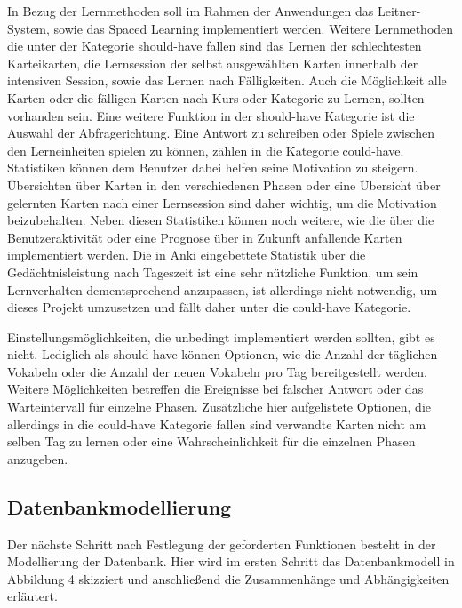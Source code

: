 In Bezug der Lernmethoden soll im Rahmen der Anwendungen das Leitner-System, sowie das Spaced Learning implementiert werden. Weitere Lernmethoden die unter der Kategorie should-have fallen sind das Lernen der schlechtesten Karteikarten, die Lernsession der selbst ausgewählten Karten innerhalb der intensiven Session, sowie das Lernen nach Fälligkeiten. Auch die Möglichkeit alle Karten oder die fälligen Karten nach Kurs oder Kategorie zu Lernen, sollten vorhanden sein. Eine weitere Funktion in der should-have Kategorie ist die Auswahl der Abfragerichtung. Eine Antwort zu schreiben oder Spiele zwischen den Lerneinheiten spielen zu können, zählen in die Kategorie could-have. \\

Statistiken können dem Benutzer dabei helfen seine Motivation zu steigern. Übersichten über Karten in den verschiedenen Phasen oder eine Übersicht über gelernten Karten nach einer Lernsession sind daher wichtig, um die Motivation beizubehalten. Neben diesen Statistiken können noch weitere, wie die über die Benutzeraktivität oder eine Prognose über in Zukunft anfallende Karten implementiert werden. Die in Anki eingebettete Statistik über die Gedächtnisleistung nach Tageszeit ist eine sehr nützliche Funktion, um sein Lernverhalten dementsprechend anzupassen, ist allerdings nicht notwendig, um dieses Projekt umzusetzen und fällt daher unter die could-have Kategorie.

Einstellungsmöglichkeiten, die unbedingt implementiert werden sollten, gibt es nicht. Lediglich als should-have können Optionen, wie die Anzahl der täglichen Vokabeln oder die Anzahl der neuen Vokabeln pro Tag bereitgestellt werden. Weitere Möglichkeiten betreffen die Ereignisse bei falscher Antwort oder das Warteintervall für einzelne Phasen. Zusätzliche hier aufgelistete Optionen, die allerdings in die could-have Kategorie fallen sind verwandte Karten nicht am selben Tag zu lernen oder eine Wahrscheinlichkeit für die einzelnen Phasen anzugeben. 




\subsection{Datenbankmodellierung}

Der nächste Schritt nach Festlegung der geforderten Funktionen besteht in der Modellierung der Datenbank. Hier wird im ersten Schritt das Datenbankmodell in Abbildung 4 skizziert und anschließend die Zusammenhänge und Abhängigkeiten erläutert.

